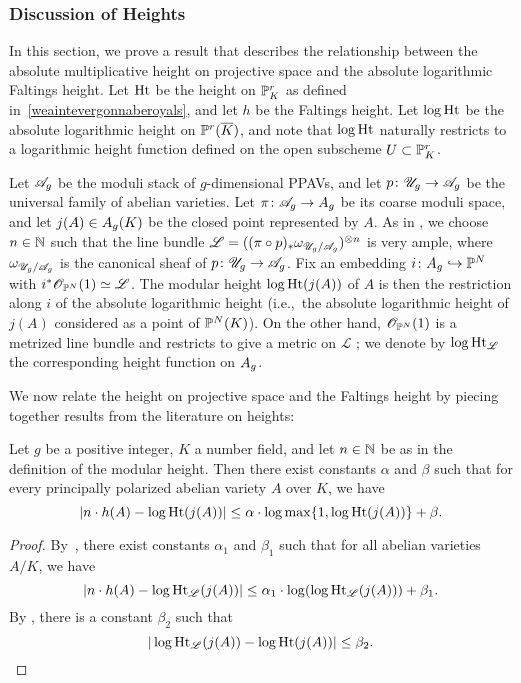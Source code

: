 \subsubsection{Discussion of Heights}
\label{subsubsection:appendix-on-heights}
In this section, we prove a result that describes the relationship between the absolute multiplicative height on projective space and the absolute logarithmic Faltings height. Let $\operatorname{Ht}$ be the height on ${\mathbb P}_K^r$ as defined in~\ref{weaintevergonnaberoyals}, and let $h$ be the Faltings height. Let $\log\operatorname{Ht}$ be the absolute logarithmic height on ${\mathbb P}^r(\overline{K})$, and note that $\log\operatorname{Ht}$ naturally restricts to a logarithmic height function defined on the open subscheme $U \subset {\mathbb P}_K^r$.

Let ${\mathscr A_g}$ be the moduli stack of $g$-dimensional PPAVs, and let $p \colon {\mathscr U_g} \rightarrow{\mathscr A_g}$ be the universal family of abelian varieties. Let $\pi\colon {\mathscr A_g}\rightarrow {A_g}$ be its coarse moduli space, and let $j(A)\in {A_g}(K)$ be the closed point represented by $A$. As in \cite[Section 2]{FalFinite}, we choose $n\in{\mathbb N}$ such that the line bundle $\mathscr{L}=((\pi \circ p)_*\omega_{{\mathscr U_g}/{\mathscr A_g}})^{\otimes n}$ is very ample, where $\omega_{{\mathscr U_g}/{\mathscr A_g}}$ is the canonical sheaf of $p \colon {\mathscr U_g} \rightarrow {\mathscr A_g}$. Fix an embedding $i\colon{A_g}\hookrightarrow{\mathbb P}^N$ with $i^*{\mathscr O}_{\mathbb P^N}(1) \simeq \mathscr{L}$. The modular height $\log \operatorname{Ht}(j(A))$ of $A$ is then the restriction along $i$ of the absolute logarithmic height (i.e.,~the absolute logarithmic height of $j(A)$ considered as a point of ${\mathbb P}^N(K)$). On the other hand, ${\mathscr O}_{\mathbb P^N}(1)$ is a metrized line bundle and restricts to give a metric on $\mathscr{L}$ \cite[p.~36]{FalRP}; we denote by $\log\operatorname{Ht}_{\mathscr{L}}$ the corresponding height function on ${A_g}$.

We now relate the height on projective space and the Faltings height by piecing together results from the literature on heights:

\begin{lemma} \label{lemma: height-0}
Let $g$ be a positive integer, $K$ a number field, and let $n\in {\mathbb N}$ be as in the definition of the modular height. Then there exist constants $\alpha$ and $\beta$ such that for every principally polarized abelian variety $A$ over $K$, we have
\[|n\cdot h(A)-\log\operatorname{Ht}(j(A))|\leq \alpha \cdot \log\max\{1, \log\operatorname{Ht}(j(A))\}+\beta.\]
\end{lemma}
\begin{proof}
By~\cite[Proof of Lemma 3]{FalFinite}, there exist constants $\alpha_1$ and $\beta_1$ such that for all abelian varieties $A/K$, we have
\[|n\cdot h(A)-\log\operatorname{Ht}_{\mathscr{L}}(j(A))|\leq \alpha_1 \cdot \log(\log\operatorname{Ht}_{\mathscr{L}}(j(A)))+\beta_1.\]
By \cite[B.3.2(b)]{afraidofheights}, there is a constant $\beta_2$ such that
\[|\log\operatorname{Ht}_{\mathscr{L}}(j(A))-\log\operatorname{Ht}(j(A))|\leq\beta_2. \qedhere \]
\end{proof}


